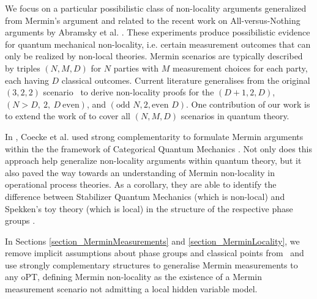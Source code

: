         We focus on a particular possibilistic class of non-locality arguments generalized from Mermin's argument \cite{mermin1990quantum} and related to the recent work on All-versus-Nothing arguments by Abramsky et al. \cite{NLC-AvN}. These experiments produce possibilistic evidence for quantum mechanical non-locality, i.e. certain measurement outcomes that can only be realized by non-local theories.  Mermin scenarios are typically described by triples $(N,M,D)$ for $N$ parties with $M$ measurement choices for each party, each having $D$ classical outcomes. Current literature generalises from the original $(3,2,2)$ scenario~\cite{mermin1990quantum} to derive non-locality proofs for the $(D+1,2,D)$\cite{zukowski-GHZ-multiport}, $(N>D,~2,~D~\mbox{even})$\cite{cerf-GHZ-many}, and $(\mbox{odd }N, 2, \mbox{even }D)$\cite{lee-even-dim}. One contribution of our work is to extend the work of \cite{coecke2012strong} to cover all $(N,M,D)$ scenarios in quantum theory.

In \cite{coecke2012strong}, Coecke et al. used strong complementarity to formulate Mermin arguments within the the framework of Categorical Quantum Mechanics \cite{abramsky2008categorical}. Not only does this approach help generalize non-locality arguments within quantum theory, but it also paved the way towards an understanding of Mermin non-locality in operational process theories. As a corollary, they are able to identify the difference between Stabilizer Quantum Mechanics (which is non-local) and Spekken's toy theory (which is local) in the structure of the respective phase groups \cite{coecke2012strong,coecke2011phase}.

In Sections \ref{section_MerminMeasurements} and \ref{section_MerminLocality}, we remove implicit assumptions about phase groups and classical points from~\cite{coecke2012strong} and use strongly complementary structures to generalise Mermin measurements to any oPT, defining Mermin non-locality as the existence of a Mermin measurement scenario not admitting a local hidden variable model.

